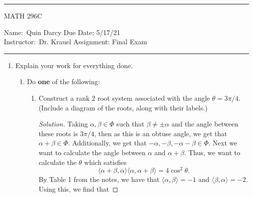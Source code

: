\documentclass[12pt]{article}
\theoremstyle{definition}
\newenvironment{solution}
  {\renewcommand\qedsymbol{$\blacksquare$}\begin{proof}[Solution]}
  {\end{proof}}
\begin{document}
    \thispagestyle{empty}\hrule

    \begin{center}
        \vspace{.4cm} { \large MATH 296C}
    \end{center}
    {Name:\ Quin Darcy \hspace{\fill} Due Date: 5/17/21 \\
    { Instructor:}\ Dr. Krauel \hspace{\fill} Assignment:
    Final Exam \\  \hrule}

    \begin{enumerate}
        \item Explain your work for everything done.
            \begin{enumerate}[label=\textbf{\alph*}.]
                \item Do \textbf{one} of the following:
                    \begin{enumerate}[label=(\Roman*)]
                        \item Construct a rank 2 root system associated with
                            the angle $\theta=3\pi/4$. (Include a diagram of
                            the roots, along with their labels.)
                            \begin{solution}
                                Taking $\alpha, \beta\in\Phi$ such that
                                $\beta\neq\pm\alpha$ and the angle between
                                these roots is $3\pi/4$, then as this is an
                                obtuse angle, we get that
                                $\alpha+\beta\in\Phi$. Additionally, we get
                                that $-\alpha, -\beta, -\alpha-\beta\in\Phi$.
                                Next we want to calculate the angle between
                                $\alpha$ and $\alpha+\beta$. Thus, we want to
                                calculate the $\theta$ which satisfies
                                \begin{equation*}
                                    \langle\alpha+\beta,
                                    \alpha\rangle\langle\alpha,
                                    \alpha+\beta\rangle=4\cos^2\theta.
                                \end{equation*}
                                By Table 1 from the notes, we have that
                                $\langle\alpha, \beta\rangle = -1$ and
                                $\langle\beta, \alpha\rangle=-2$. Using this, we find that 

\end{solution}
\end{enumerate}
\end{enumerate}
\end{enumerate}
\end{document}
